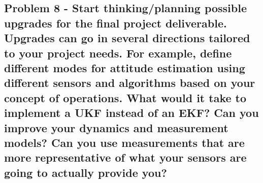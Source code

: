 \subsection{Problem 8 - Start thinking/planning possible upgrades for the final project deliverable. Upgrades can go in several directions tailored to your project needs. For example, define different modes for attitude estimation using different sensors and algorithms based on your concept of operations. What would it take to implement a UKF instead of an EKF? Can you improve your dynamics and measurement models? Can you use measurements that are more representative of what your sensors are going to actually provide you? }